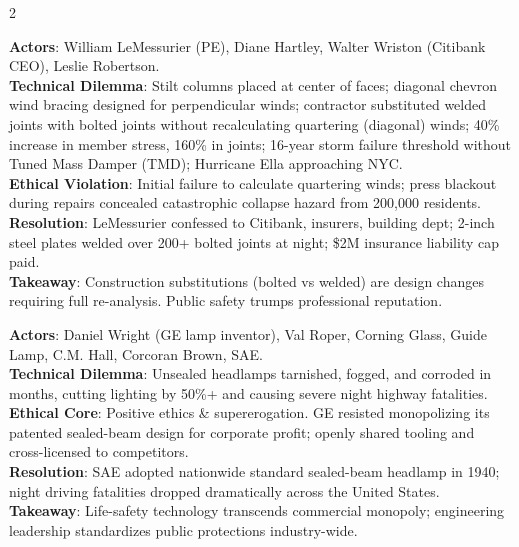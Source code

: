 \documentclass[9pt,a4paper]{extarticle}
\begin{document}
\begin{multicols}{2}
\begin{tcolorbox}[casebox,title={1. Citicorp Center (1978)}]
\textbf{Actors}: William LeMessurier (PE), Diane Hartley, Walter Wriston (Citibank CEO), Leslie Robertson.\\
\textbf{Technical Dilemma}: Stilt columns placed at center of faces; diagonal chevron wind bracing designed for perpendicular winds; contractor substituted welded joints with bolted joints without recalculating quartering (diagonal) winds; 40\% increase in member stress, 160\% in joints; 16-year storm failure threshold without Tuned Mass Damper (TMD); Hurricane Ella approaching NYC.\\
\textbf{Ethical Violation}: Initial failure to calculate quartering winds; press blackout during repairs concealed catastrophic collapse hazard from 200,000 residents.\\
\textbf{Resolution}: LeMessurier confessed to Citibank, insurers, building dept; 2-inch steel plates welded over 200+ bolted joints at night; \$2M insurance liability cap paid.\\
\textbf{Takeaway}: Construction substitutions (bolted vs welded) are design changes requiring full re-analysis. Public safety trumps professional reputation.
\end{tcolorbox}

\begin{tcolorbox}[casebox,title={2. GE Sealed-Beam Headlamp (1930s)}]
\textbf{Actors}: Daniel Wright (GE lamp inventor), Val Roper, Corning Glass, Guide Lamp, C.M. Hall, Corcoran Brown, SAE.\\
\textbf{Technical Dilemma}: Unsealed headlamps tarnished, fogged, and corroded in months, cutting lighting by 50\%+ and causing severe night highway fatalities.\\
\textbf{Ethical Core}: Positive ethics \& supererogation. GE resisted monopolizing its patented sealed-beam design for corporate profit; openly shared tooling and cross-licensed to competitors.\\
\textbf{Resolution}: SAE adopted nationwide standard sealed-beam headlamp in 1940; night driving fatalities dropped dramatically across the United States.\\
\textbf{Takeaway}: Life-safety technology transcends commercial monopoly; engineering leadership standardizes public protections industry-wide.
\end{tcolorbox}


\end{multicols}
\end{document}
